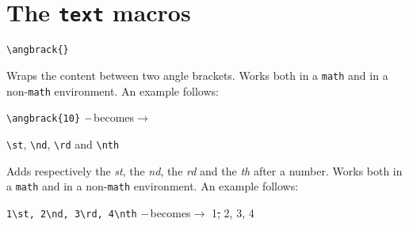 \documentclass[]{notex}
\newcommand{\becomes}[1]{\hspace{#1} $\--$becomes$\rightarrow$ \hspace{#1}}
\begin{document}
\section{The \texttt{text} macros}

\begin{tcolorbox}
    \verb|\angbrack{}|
\end{tcolorbox}

\noindent Wraps the content between two angle brackets. Works both in a \texttt{math} and in a non-\texttt{math} environment. An example follows:
\begin{center}
    \verb|\angbrack{10}| \becomes{20pt} 
\end{center}

\begin{tcolorbox}
    \verb|\st|, \verb|\nd|, \verb|\rd| and \verb|\nth|
\end{tcolorbox}

\noindent Adds respectively the \textit{st}, the \textit{nd}, the \textit{rd} and the \textit{th} after a number. Works both in a \texttt{math} and in a non-\texttt{math} environment. An example follows:
\begin{center}
    \verb|1\st, 2\nd, 3\rd, 4\nth| \becomes{20pt} 1\st, 2\nd, 3\rd, 4\nth
\end{center}
\end{document}
